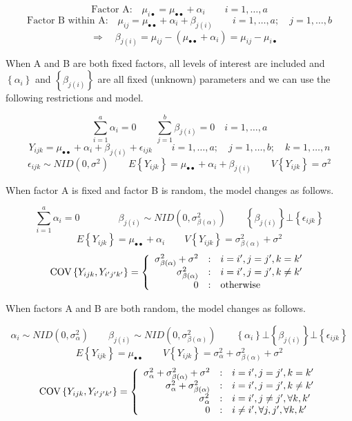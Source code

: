 \documentclass[
]{book}
\begin{document}
\[
\mbox{Factor A:}\quad \mu_{i\bullet} = \mu_{\bullet\bullet}+\alpha_i \qquad
i=1,\ldots,a
\] \[
\mbox{Factor B within A:} \quad
\mu_{ij}=\mu_{\bullet\bullet}+\alpha_i+\beta_{j(i)} \qquad
i=1,\ldots,a; 
\quad j=1,\ldots,b
\] \[
\quad \Rightarrow \quad \beta_{j(i)} =
\mu_{ij}-\left(\mu_{\bullet\bullet}+\alpha_i\right)=\mu_{ij}-\mu_{i\bullet}
\]

When A and B are both fixed factors, all levels of interest are included
and \(\left\{\alpha_i\right\}\) and \(\left\{\beta_{j(i)}\right\}\) are
all fixed (unknown) parameters and we can use the following restrictions
and model.

\[
\sum_{i=1}^a \alpha_i=0 \qquad \sum_{j=1}^b\beta_{j(i)}=0 \quad i=1,\ldots,a
\] \[
Y_{ijk}=\mu_{\bullet\bullet}+\alpha_i+\beta_{j(i)} +\epsilon_{ijk}
\qquad i=1,\ldots,a;\quad j=1,\ldots,b; \quad k=1,\ldots,n
\] \[
\epsilon_{ijk} \sim NID\left(0,\sigma^2\right) \qquad
E\left\{Y_{ijk}\right\}=\mu_{\bullet\bullet}+\alpha_i+\beta_{j(i)} \qquad
V\left\{Y_{ijk}\right\}=\sigma^2
\]

When factor A is fixed and factor B is random, the model changes as
follows.

\[
\sum_{i=1}^a \alpha_i=0 \qquad \qquad 
\beta_{j(i)} \sim NID\left(0,\sigma_{\beta(\alpha)}^2\right)
\qquad \left\{\beta_{j(i)}\right\} \bot
\left\{\epsilon_{ijk}\right\}
\] \[
E\left\{Y_{ijk}\right\} = \mu_{\bullet\bullet}+\alpha_i  \qquad
V\left\{Y_{ijk}\right\} = \sigma_{\beta(\alpha)}^2 + \sigma^2 
\] \[
\mbox{COV}\left\{Y_{ijk},Y_{i'j'k'}\right\} = 
\left\{ \begin{array}{r@{\quad:\quad}l}
    \sigma_{\beta(\alpha)}^2 +  \sigma^2 & i=i',j=j',k=k' \\
    \sigma_{\beta(\alpha)}^2  & i=i', j=j',k\ne k' \\
    0 & \mbox{otherwise}\\
    \end{array} \right.
\]

When factors A and B are both random, the model changes as follows.

\[
\alpha_i\sim NID\left(0,\sigma_{\alpha}^2\right) \qquad
\beta_{j(i)} \sim NID\left(0,\sigma_{\beta(\alpha)}^2\right)
\qquad \left\{\alpha_i\right\} \bot\left\{\beta_{j(i)}\right\} \bot
\left\{\epsilon_{ijk}\right\}
\] \[
E\left\{Y_{ijk}\right\} = \mu_{\bullet\bullet}  \qquad
V\left\{Y_{ijk}\right\} = \sigma_{\alpha}^2+\sigma_{\beta(\alpha)}^2 + \sigma^2 
\] \[
\mbox{COV}\left\{Y_{ijk},Y_{i'j'k'}\right\} = 
\left\{ \begin{array}{r@{\quad:\quad}l}
    \sigma_{\alpha}^2 + \sigma_{\beta(\alpha)}^2 +  \sigma^2 & i=i',j=j',k=k' \\
    \sigma_{\alpha}^2 +\sigma_{\beta(\alpha)}^2  & i=i', j=j',k\ne k' \\
    \sigma_{\alpha}^2  & i=i',j\ne j', \forall k,k'\\
    0 & i\neq i', \forall j,j', \forall k,k'\\
    \end{array} \right.
\]
\end{document}

